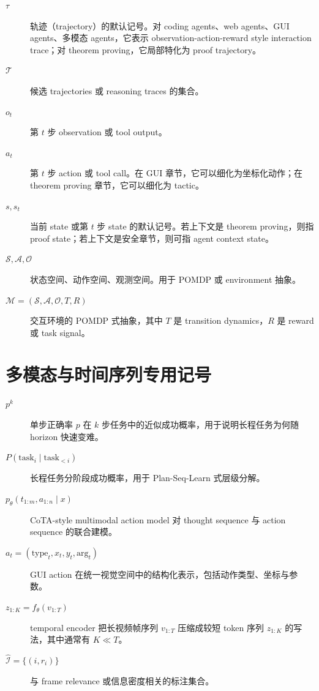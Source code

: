 \begin{description}
\item[$\tau$] 轨迹（trajectory）的默认记号。对 coding agents、web agents、GUI agents、多模态 agents，它表示 observation-action-reward style interaction trace；对 theorem proving，它局部特化为 proof trajectory。

\item[$\mathcal{T}$] 候选 trajectories 或 reasoning traces 的集合。

\item[$o_t$] 第 $t$ 步 observation 或 tool output。

\item[$a_t$] 第 $t$ 步 action 或 tool call。在 GUI 章节，它可以细化为坐标化动作；在 theorem proving 章节，它可以细化为 tactic。

\item[$s, s_t$] 当前 state 或第 $t$ 步 state 的默认记号。若上下文是 theorem proving，则指 proof state；若上下文是安全章节，则可指 agent context state。

\item[$\mathcal{S}, \mathcal{A}, \mathcal{O}$] 状态空间、动作空间、观测空间。用于 POMDP 或 environment 抽象。

\item[$\mathcal{M}=(\mathcal{S},\mathcal{A},\mathcal{O},T,R)$] 交互环境的 POMDP 式抽象，其中 $T$ 是 transition dynamics，$R$ 是 reward 或 task signal。
\end{description}

\section{多模态与时间序列专用记号}

\begin{description}
\item[$p^k$] 单步正确率 $p$ 在 $k$ 步任务中的近似成功概率，用于说明长程任务为何随 horizon 快速变难。

\item[$P(\mathrm{task}_i \mid \mathrm{task}_{<i})$] 长程任务分阶段成功概率，用于 Plan-Seq-Learn 式层级分解。

\item[$p_\theta(t_{1:m}, a_{1:n} \mid x)$] CoTA-style multimodal action model 对 thought sequence 与 action sequence 的联合建模。

\item[$a_t=(\mathrm{type}_t,x_t,y_t,\mathrm{arg}_t)$] GUI action 在统一视觉空间中的结构化表示，包括动作类型、坐标与参数。

\item[$z_{1:K}=f_\theta(v_{1:T})$] temporal encoder 把长视频帧序列 $v_{1:T}$ 压缩成较短 token 序列 $z_{1:K}$ 的写法，其中通常有 $K \ll T$。

\item[$\hat{\mathcal{I}}=\{(i,r_i)\}$] 与 frame relevance 或信息密度相关的标注集合。
\end{description}

